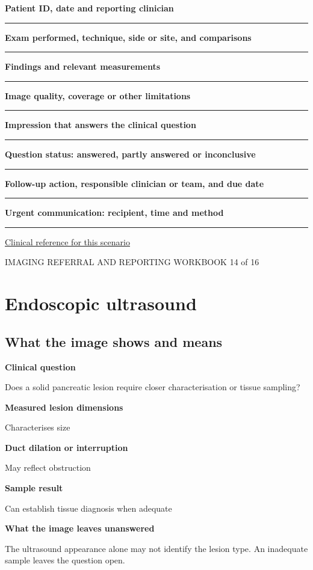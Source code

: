 \documentclass[11pt,a4paper]{article}
\newcommand{\record}[1]{\textbf{#1}\par\vspace{0.55\baselineskip}\hrule\vspace{0.35\baselineskip}}
\begin{document}
\record{Patient ID, date and reporting clinician}

\record{Exam performed, technique, side or site, and comparisons}

\record{Findings and relevant measurements}

\record{Image quality, coverage or other limitations}

\record{Impression that answers the clinical question}

\record{Question status: answered, partly answered or inconclusive}

\record{Follow-up action, responsible clinician or team, and due date}

\record{Urgent communication: recipient, time and method}

\small\href{https://pubmed.ncbi.nlm.nih.gov/39387777/}{Clinical reference for this scenario}

\normalsize

\newpage

{\small IMAGING REFERRAL AND REPORTING WORKBOOK \hfill 14 of 16}

\section*{Endoscopic ultrasound}

\subsection*{What the image shows and means}

\textbf{Clinical question}\par Does a solid pancreatic lesion require closer characterisation or tissue sampling?\par

\textbf{Measured lesion dimensions}\par Characterises size\par

\textbf{Duct dilation or interruption}\par May reflect obstruction\par

\textbf{Sample result}\par Can establish tissue diagnosis when adequate\par

\textbf{What the image leaves unanswered}\par The ultrasound appearance alone may not identify the lesion type. An inadequate sample leaves the question open.\par
\end{document}
